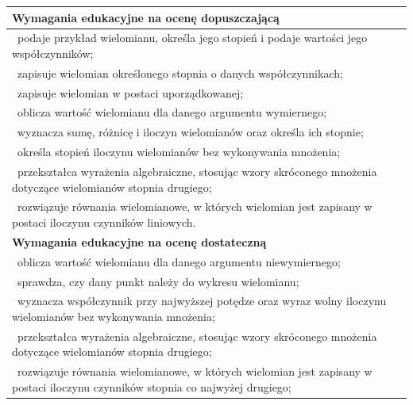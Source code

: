 \documentclass[12pt,a4paper]{article}
\begin{document}
	\begin{longtable}{|p{16cm}|}
		\hline
		
		\textbf{Wymagania edukacyjne na ocenę dopuszczającą} \\ \hline
		
		\textbullet\ podaje przykład wielomianu, określa jego stopień i podaje wartości jego współczynników; \\
		
		\textbullet\ zapisuje wielomian określonego stopnia o danych współczynnikach; \\
		
		\textbullet\ zapisuje wielomian w postaci uporządkowanej; \\
		
		\textbullet\ oblicza wartość wielomianu dla danego argumentu wymiernego; \\
		
		\textbullet\ wyznacza sumę, różnicę i iloczyn wielomianów oraz określa ich stopnie; \\
		
		\textbullet\ określa stopień iloczynu wielomianów bez wykonywania mnożenia; \\
		
		\textbullet\ przekształca wyrażenia algebraiczne, stosując wzory skróconego mnożenia dotyczące wielomianów stopnia drugiego; \\
		
		\textbullet\ rozwiązuje równania wielomianowe, w których wielomian jest zapisany w postaci iloczynu czynników liniowych. \\ \hline
		
		\textbf{Wymagania edukacyjne na ocenę dostateczną} \\ \hline
		
		\textbullet\ oblicza wartość wielomianu dla danego argumentu niewymiernego; \\
		
		\textbullet\ sprawdza, czy dany punkt należy do wykresu wielomianu; \\
		
		\textbullet\ wyznacza współczynnik przy najwyższej potędze oraz wyraz wolny iloczynu wielomianów bez wykonywania mnożenia; \\
		
		\textbullet\ przekształca wyrażenia algebraiczne, stosując wzory skróconego mnożenia dotyczące wielomianów stopnia drugiego; \\
		
		\textbullet\ rozwiązuje równania wielomianowe, w których wielomian jest zapisany w postaci iloczynu czynników stopnia co najwyżej drugiego; \\
		

\end{longtable}
\end{document}
